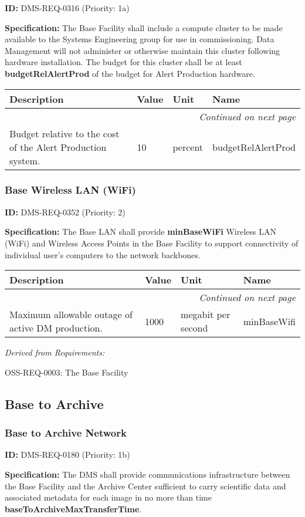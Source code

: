 \documentclass[SE,toc,lsstdraft]{lsstdoc}
\makeatletter
\newcommand{\paramname}[1]{\hspace{0pt}#1}
\newcommand{\unitname}[1]{\hspace{0pt}#1}
\newenvironment{parameters}[0]{%
\setlength\LTleft{0pt}
\setlength\LTright{\fill}
\begin{small}
\begin{longtable}[]{|p{0.49\textwidth}|l|p{0.6in}|p{1.70in}@{}|}

\hline \textbf{Description} & \textbf{Value} & \textbf{Unit} & \textbf{Name} \\ \hline
\endhead

\hline \multicolumn{4}{r}{\emph{Continued on next page}} \\
\endfoot

\hline\hline
\endlastfoot
}{%
\hline
\end{longtable}
\end{small}
}
\makeatother
\begin{document}
\label{DMS-REQ-0316}
\textbf{ID:} DMS-REQ-0316 (Priority: 1a)

\textbf{Specification:} The Base Facility shall include a compute cluster to be made available to the Systems Engineering group for use in commissioning.  Data Management will not administer or otherwise maintain this cluster following hardware installation. The budget for this cluster shall be at least \textbf{budgetRelAlertProd} of the budget for Alert Production hardware.

\begin{parameters}
Budget relative to the cost of the Alert Production system.
&
10
&
\unitname{%
percent
}
&
\paramname{%
budgetRelAlertProd
} \\\hline
\end{parameters}

\subsubsection{Base Wireless LAN (WiFi)}

\label{DMS-REQ-0352}
\textbf{ID:} DMS-REQ-0352 (Priority: 2)

\textbf{Specification:}
The Base LAN shall provide \textbf{minBaseWiFi} Wireless LAN (WiFi) and Wireless Access Points in the Base Facility to support connectivity of individual user's computers to the network backbones.

\begin{parameters}
Maximum allowable outage of active DM production.
&
1000
&
\unitname{%
megabit per second
}
&
\paramname{%
minBaseWifi
} \\\hline
\end{parameters}

\emph{Derived from Requirements:}

OSS-REQ-0003:
The Base Facility \newline

\subsection{Base to Archive}

\subsubsection{Base to Archive Network}

\label{DMS-REQ-0180}
\textbf{ID:} DMS-REQ-0180 (Priority: 1b)

\textbf{Specification:} The DMS shall provide communications infrastructure between the Base Facility and the Archive Center sufficient to carry scientific data and associated metadata for each image in no more than time \textbf{baseToArchiveMaxTransferTime}.
\end{document}
